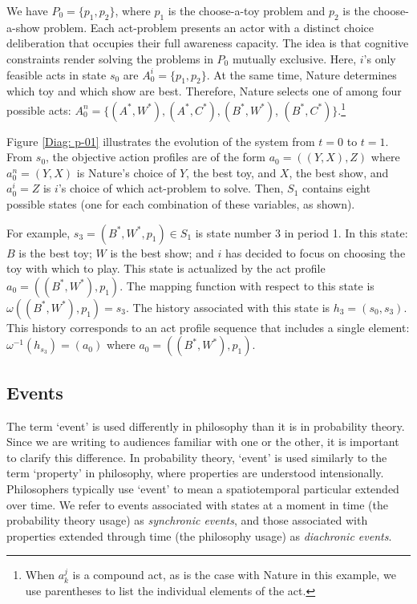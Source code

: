 \documentclass[
11pt,
titlepage,
reqno,
]{article}%
\theoremstyle{definition}
\begin{document}
{We have $P_{0}=\{p_1,p_2\}$, where $p_1$ is the choose-a-toy problem and $p_2$ is the choose-a-show problem.
Each act-problem presents an actor with a distinct choice deliberation that occupies their full awareness capacity.
The idea is that cognitive constraints render solving the problems in $P_{0}$ mutually exclusive.
Here, $i$'s only feasible acts in state $s_0$ are  $A^i_{0}=\{p_1,p_2\}$.
At the same time, Nature determines which toy and which show are best.
Therefore, Nature selects one of among four possible acts: $A^n_{0}=\{(A^\ast,W^\ast),(A^\ast,C^\ast),(B^\ast,W^\ast)$, $(B^\ast,C^\ast)\}$.\footnote
{
	When $a^j_k$ is a compound act, as is the case with Nature in this example, we use parentheses to list the individual elements of the act.
}

Figure \ref{Diag: p-01} illustrates the evolution of the system from $t=0$ to $t=1$. 
From $s_0$, the objective action profiles are of the form $a_{0}=((Y,X),Z)$ where $a^n_{0}=(Y,X)$ is Nature's choice of  $Y$, the best toy, and $X$, the best show, and $a^i_{0}=Z$ is $i$'s choice of which act-problem to solve.
Then, $S_1$ contains eight possible states (one for each combination of these variables, as shown).

For example, $s_{3}=(B^\ast,W^\ast,p_1)\in S_1$ is state number 3 in period 1.
In this state: $B$ is the best toy; $W$ is the best show; and $i$ has decided to focus on choosing the toy with which to play.
This state is actualized by the act profile $a_0=((B^\ast,W^\ast),p_1)$.
The mapping function with respect to this state is $\omega((B^\ast,W^\ast),p_1)=s_{3}$.
The history associated with this state is $h_{3}=(s_0,s_{3})$.
This history corresponds to an act profile  sequence that includes a single element:  $\omega^{-1}(h_{s_{3}})=(a_0)$ where $a_0=((B^\ast,W^\ast),p_1)$.
}	
	
\subsection{Events}

The term `event' is used differently in philosophy than it is in probability theory. 
Since we are writing to audiences familiar with one or the other, it is important to clarify this difference. 
In probability theory, `event' is used similarly to the term `property' in philosophy, where properties are understood intensionally. 
Philosophers typically use `event' to mean a spatiotemporal particular extended over time. 
We refer to events associated with states at a moment in time (the probability theory usage) as \textit{synchronic events}, and those associated with properties extended through time (the philosophy usage) as \textit{diachronic events}.
\end{document}
